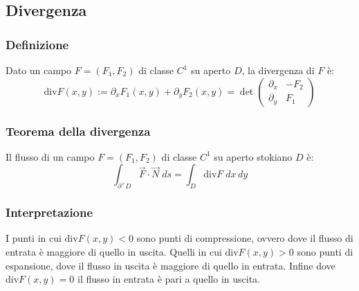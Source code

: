 \documentclass[a4paper]{article}
\newcommand\diver{\text{div}} %
\begin{document}
\subsection{Divergenza}
\subsubsection*{Definizione}
Dato un campo \(F = (F_1, F_2)\) di classe \(C^1\) su aperto \(D\), la divergenza di \(F\) è:
\[\diver F(x,y) := \partial_x F_1(x,y) + \partial_y F_2(x,y) = \det \left(\begin{matrix} \partial_x & -F_2 \\ \partial_y & F_1 \end{matrix}\right)\]

\subsubsection*{Teorema della divergenza}
Il flusso di un campo \(F = (F_1, F_2)\) di classe \(C^1\) su aperto stokiano \(D\) è:
\[\int_{\partial^+D} \vec{F} \cdot \vec{N} \; ds = \int_D \diver F \; dx \, dy\]

\subsubsection*{Interpretazione}
I punti in cui \(\diver F(x,y) < 0\) sono punti di compressione, ovvero dove il flusso di entrata è maggiore di quello in uscita.
Quelli in cui \(\diver F(x,y) > 0\) sono punti di espansione, dove il flusso in uscita è maggiore di quello in entrata. Infine
dove \(\diver F(x,y) = 0\) il flusso in entrata è pari a quello in uscita.
\end{document}
